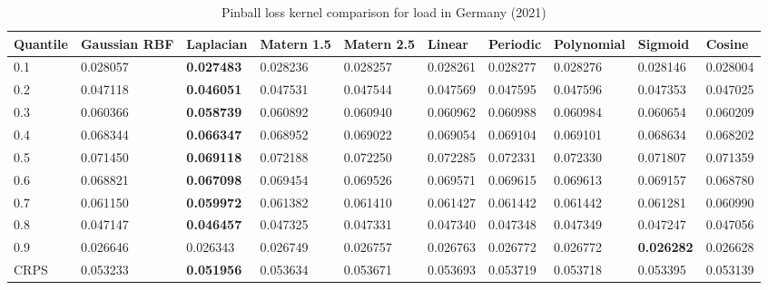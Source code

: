 \begin{table}[!ht]
    \centering
\caption{Pinball loss kernel comparison for load in Germany (2021)}
\label{tab:secures_met_de}
\begin{adjustbox}{width=\textwidth}
    \begin{tabular}{llllllllll}
\toprule
Quantile & Gaussian RBF & Laplacian & Matern 1.5 & Matern 2.5 & Linear & Periodic & Polynomial & Sigmoid & Cosine \\
\midrule
0.1 & 0.028057 & \textbf{0.027483} & 0.028236 & 0.028257 & 0.028261 & 0.028277 & 0.028276 & 0.028146 & 0.028004 \\
0.2 & 0.047118 & \textbf{0.046051} & 0.047531 & 0.047544 & 0.047569 & 0.047595 & 0.047596 & 0.047353 & 0.047025 \\
0.3 & 0.060366 & \textbf{0.058739} & 0.060892 & 0.060940 & 0.060962 & 0.060988 & 0.060984 & 0.060654 & 0.060209 \\
0.4 & 0.068344 & \textbf{0.066347} & 0.068952 & 0.069022 & 0.069054 & 0.069104 & 0.069101 & 0.068634 & 0.068202 \\
0.5 & 0.071450 & \textbf{0.069118} & 0.072188 & 0.072250 & 0.072285 & 0.072331 & 0.072330 & 0.071807 & 0.071359 \\
0.6 & 0.068821 & \textbf{0.067098} & 0.069454 & 0.069526 & 0.069571 & 0.069615 & 0.069613 & 0.069157 & 0.068780 \\
0.7 & 0.061150 & \textbf{0.059972} & 0.061382 & 0.061410 & 0.061427 & 0.061442 & 0.061442 & 0.061281 & 0.060990 \\
0.8 & 0.047147 & \textbf{0.046457} & 0.047325 & 0.047331 & 0.047340 & 0.047348 & 0.047349 & 0.047247 & 0.047056 \\
0.9 & 0.026646 & 0.026343 & 0.026749 & 0.026757 & 0.026763 & 0.026772 & 0.026772 & \textbf{0.026282} & 0.026628 \\ 
\midrule
CRPS & 0.053233 & \textbf{0.051956} & 0.053634 & 0.053671 & 0.053693 & 0.053719 & 0.053718 & 0.053395 & 0.053139 \\
\bottomrule
\end{tabular}
\end{adjustbox}
\end{table}





